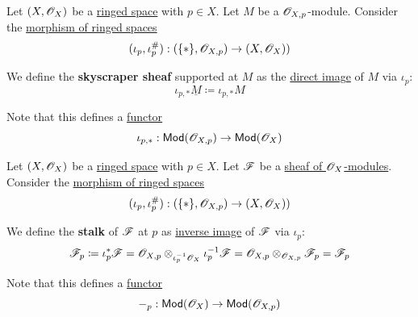 \documentclass[../../../main]{subfiles}
\begin{document}
\begin{definition} \label{def:skyscraper-ox-mod}
  Let \((X, \mathscr{O}_{X})\) be a \hyperref[def:ringed-space]{ringed space} with \(p \in X\).
  Let \(M\) be a \(\mathscr{O}_{X, p}\)-module.
  Consider the \hyperref[def:ringed-space]{morphism of ringed spaces}
  \begin{equation*}
    (\iota_{p}, \iota_{p}^{\#}): (\{\ast\}, \mathscr{O}_{X, p}) \to (X, \mathscr{O}_{X}))
  \end{equation*}
  
  We define the \textbf{skyscraper sheaf} supported at \(M\) as the \hyperref[def:direct-image-ox-mod]{direct image} of \(M\) via \(\iota_{p}\):
  \begin{equation*}
    \iota_{p, \ast}\underline{M} \coloneq \iota_{p, \ast}M
  \end{equation*}

  Note that this defines a \hyperref[def:functor]{functor}
  \begin{equation*}
    \iota_{p, \ast}: \mathsf{Mod}(\mathscr{O}_{X, p}) \to \mathsf{Mod}(\mathscr{O}_{X})
  \end{equation*}
\end{definition}

\begin{definition}[Stalk] \label{def:stalk-ox-mod}
  Let \((X, \mathscr{O}_{X})\) be a \hyperref[def:ringed-space]{ringed space} with \(p \in X\).
  Let \(\mathscr{F}\) be a \hyperref[def:sheaf-of-modules]{sheaf of \(\mathscr{O}_{X}\)-modules}.
  Consider the \hyperref[def:ringed-space]{morphism of ringed spaces}
  \begin{equation*}
    (\iota_{p}, \iota_{p}^{\#}): (\{\ast\}, \mathscr{O}_{X, p}) \to (X, \mathscr{O}_{X}))
  \end{equation*}

  We define the \textbf{stalk} of \(\mathscr{F}\) at \(p\) as \hyperref[def:inverse-image-ox-mod]{inverse image} of \(\mathscr{F}\) via \(\iota_{p}\):
  \begin{equation*}
    \mathscr{F}_{p} \coloneq \iota_{p}^{\ast}\mathscr{F} = \mathscr{O}_{X, p} \otimes_{\iota_{p}^{-1}\mathscr{O}_{X}} \iota_{p}^{-1}\mathscr{F} = \mathscr{O}_{X, p} \otimes_{\mathscr{O}_{X, p}} \mathscr{F}_{p} = \mathscr{F}_{p}
  \end{equation*}
  
  Note that this defines a \hyperref[def:functor]{functor}
  \begin{equation*}
    -_{p} : \mathsf{Mod}(\mathscr{O}_{X}) \to \mathsf{Mod}(\mathscr{O}_{X, p})
  \end{equation*}
\end{definition}
\end{document}
